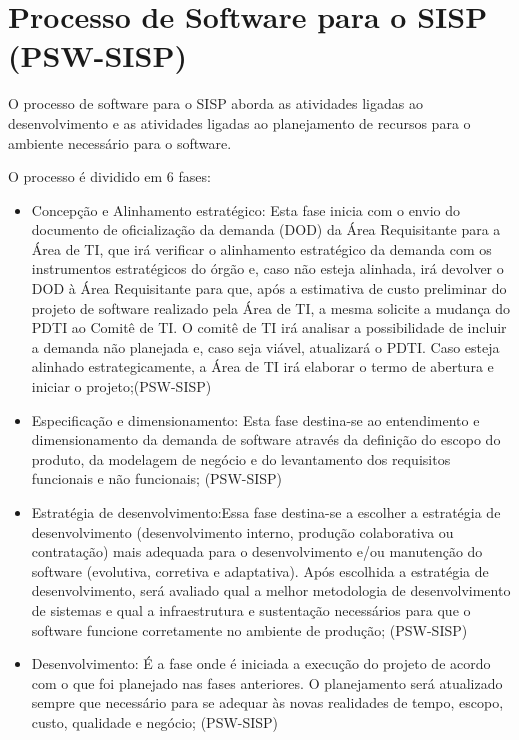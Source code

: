 \section{Processo de Software para o SISP (PSW-SISP)}

O processo de software para o SISP aborda as atividades ligadas ao desenvolvimento 
e as atividades ligadas ao planejamento de recursos para o ambiente necessário para
o software.

O processo é dividido em 6 fases:

\begin{itemize}
\item Concepção e Alinhamento estratégico: Esta fase inicia com o envio do 
documento de oficialização da demanda (DOD) da Área Requisitante para a Área de 
TI, que irá verificar o alinhamento estratégico da demanda com os instrumentos 
estratégicos do órgão e, caso não esteja alinhada, irá devolver o DOD à Área 
Requisitante para que, após a estimativa de custo preliminar do projeto de software 
realizado pela Área de TI, a mesma solicite a mudança do PDTI ao Comitê de TI. O 
comitê de TI irá analisar a possibilidade de incluir a demanda não planejada e, 
caso seja viável, atualizará o PDTI. Caso esteja alinhado estrategicamente, a 
Área de TI irá elaborar o termo de abertura e iniciar o projeto;(PSW-SISP)

\item Especificação e dimensionamento: Esta fase destina-se ao entendimento e 
dimensionamento da demanda de software através da definição do escopo do produto, 
da modelagem de negócio e do levantamento dos requisitos funcionais e não funcionais;
(PSW-SISP)

\item Estratégia de desenvolvimento:Essa fase destina-se a escolher a estratégia 
de desenvolvimento (desenvolvimento interno, produção colaborativa ou contratação) 
mais adequada para o desenvolvimento e/ou manutenção do software (evolutiva, 
corretiva e adaptativa). Após escolhida a estratégia de desenvolvimento, será 
avaliado qual a melhor metodologia de desenvolvimento de sistemas e qual a infraestrutura 
e sustentação necessários para que o software funcione corretamente no ambiente de produção; 
(PSW-SISP)

\item Desenvolvimento: É a fase onde é iniciada a execução do projeto de acordo 
com o que foi planejado nas fases anteriores. O planejamento será atualizado 
sempre que necessário para se adequar às novas realidades de tempo, escopo, 
custo, qualidade e negócio; (PSW-SISP)


\end{itemize}
